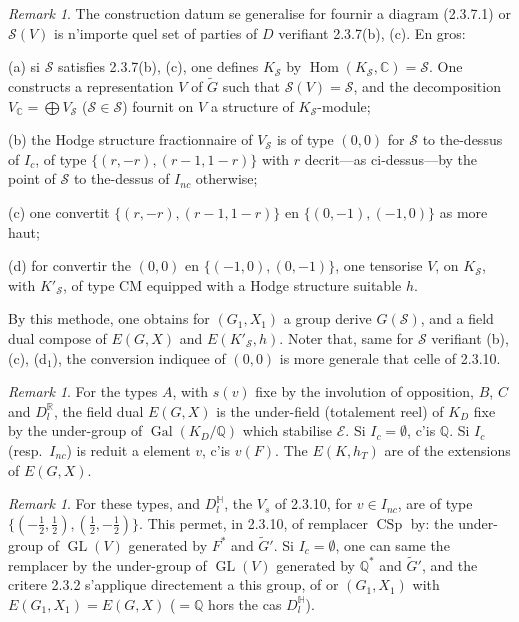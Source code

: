 \documentclass[12pt,a4paper]{article}
\theoremstyle{plain}
\theoremstyle{definition}
\theoremstyle{remark}
\newtheorem{remark}[theorem]{Remark}
\DeclareMathOperator{\Hom}{Hom}
\DeclareMathOperator{\GL}{GL}
\DeclareMathOperator{\CSp}{CSp}
\DeclareMathOperator{\Gal}{Gal}
\newcommand{\QQ}{\mathbb{Q}}
\newcommand{\RR}{\mathbb{R}}
\newcommand{\CC}{\mathbb{C}}
\begin{document}
\begin{remark}
The construction datum se generalise for fournir a diagram (2.3.7.1) or $\mathcal{S}(V)$ is n'importe quel set of parties of $D$ verifiant 2.3.7(b), (c). En gros:

(a) si $\mathcal{S}$ satisfies 2.3.7(b), (c), one defines $K_\mathcal{S}$ by $\Hom(K_\mathcal{S},\CC) = \mathcal{S}$. One constructs a representation $V$ of $\tilde{G}$ such that $\mathcal{S}(V) = \mathcal{S}$, and the decomposition $V_{\CC} = \bigoplus V_\mathcal{S}$ ($\mathcal{S} \in \mathcal{S}$) fournit on $V$ a structure of $K_\mathcal{S}$-module;

(b) the Hodge structure fractionnaire of $V_\mathcal{S}$ is of type $(0,0)$ for $\mathcal{S}$ to the-dessus of $I_c$, of type $\{(r,-r),(r-1,1-r)\}$ with $r$ decrit---as ci-dessus---by the point of $\mathcal{S}$ to the-dessus of $I_{nc}$ otherwise;

(c) one convertit $\{(r,-r),(r-1,1-r)\}$ en $\{(0,-1),(-1,0)\}$ as more haut;

(d) for convertir the $(0,0)$ en $\{(-1,0),(0,-1)\}$, one tensorise $V$, on $K_\mathcal{S}$, with $K'_\mathcal{S}$, of type CM equipped with a Hodge structure suitable $h$.

By this methode, one obtains for $(G_1,X_1)$ a group derive $G(\mathcal{S})$, and a field dual compose of $E(G,X)$ and $E(K'_\mathcal{S},h)$. Noter that, same for $\mathcal{S}$ verifiant (b), (c), (d$_1$), the conversion indiquee of $(0,0)$ is more generale that celle of 2.3.10.
\end{remark}

\begin{remark}
For the types $A$, with $s(v)$ fixe by the involution of opposition, $B$, $C$ and $D_l^{\RR}$, the field dual $E(G,X)$ is the under-field (totalement reel) of $K_D$ fixe by the under-group of $\Gal(K_D/\QQ)$ which stabilise $\mathcal{E}$. Si $I_c = \emptyset$, c'is $\QQ$. Si $I_c$ (resp.~$I_{nc}$) is reduit a element $v$, c'is $v(F)$. The $E(K,h_T)$ are of the extensions of $E(G,X)$.
\end{remark}

\begin{remark}
For these types, and $D_l^{\mathbb{H}}$, the $V_s$ of 2.3.10, for $v \in I_{nc}$, are of type $\{(-\frac{1}{2},\frac{1}{2}), (\frac{1}{2},-\frac{1}{2})\}$. This permet, in 2.3.10, of remplacer $\CSp$ by: the under-group of $\GL(V)$ generated by $F^*$ and $\tilde{G}'$. Si $I_c = \emptyset$, one can same the remplacer by the under-group of $\GL(V)$ generated by $\QQ^*$ and $\tilde{G}'$, and the critere 2.3.2 s'applique directement a this group, of or $(G_1,X_1)$ with $E(G_1,X_1) = E(G,X)$ ($= \QQ$ hors the cas $D_l^{\mathbb{H}}$).
\end{remark}
\end{document}
